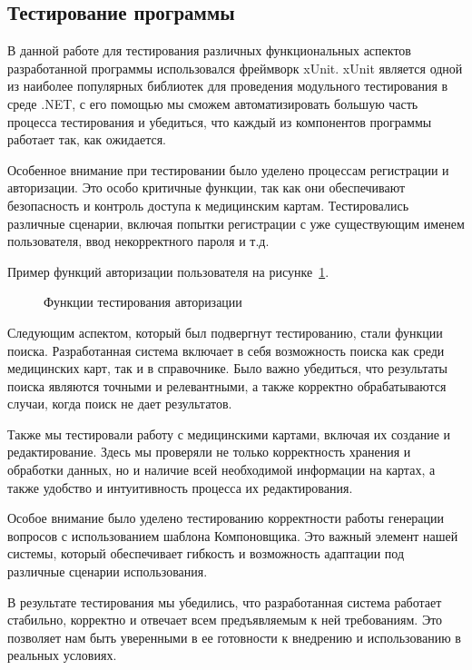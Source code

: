 \subsection{Тестирование программы}
В данной работе для тестирования различных функциональных аспектов разработанной программы использовался фреймворк xUnit. xUnit является одной из наиболее популярных библиотек для проведения модульного тестирования в среде .NET, с его помощью мы сможем автоматизировать большую часть процесса тестирования и убедиться, что каждый из компонентов программы работает так, как ожидается.

Особенное внимание при тестировании было уделено процессам регистрации и авторизации. Это особо критичные функции, так как они обеспечивают безопасность и контроль доступа к медицинским картам. Тестировались различные сценарии, включая попытки регистрации с уже существующим именем пользователя, ввод некорректного пароля и т.д.

Пример функций авторизации пользователя на рисунке~\ref{src:tests}.

\begin{figure}

\caption{Функции тестирования авторизации}
\label{src:tests}
\end{figure}

Следующим аспектом, который был подвергнут тестированию, стали функции поиска. Разработанная система включает в себя возможность поиска как среди медицинских карт, так и в справочнике. Было важно убедиться, что результаты поиска являются точными и релевантными, а также корректно обрабатываются случаи, когда поиск не дает результатов.

Также мы тестировали работу с медицинскими картами, включая их создание и редактирование. Здесь мы проверяли не только корректность хранения и обработки данных, но и наличие всей необходимой информации на картах, а также удобство и интуитивность процесса их редактирования.

Особое внимание было уделено тестированию корректности работы генерации вопросов с использованием шаблона Компоновщика. Это важный элемент нашей системы, который обеспечивает гибкость и возможность адаптации под различные сценарии использования.

В результате тестирования мы убедились, что разработанная система работает стабильно, корректно и отвечает всем предъявляемым к ней требованиям. Это позволяет нам быть уверенными в ее готовности к внедрению и использованию в реальных условиях.